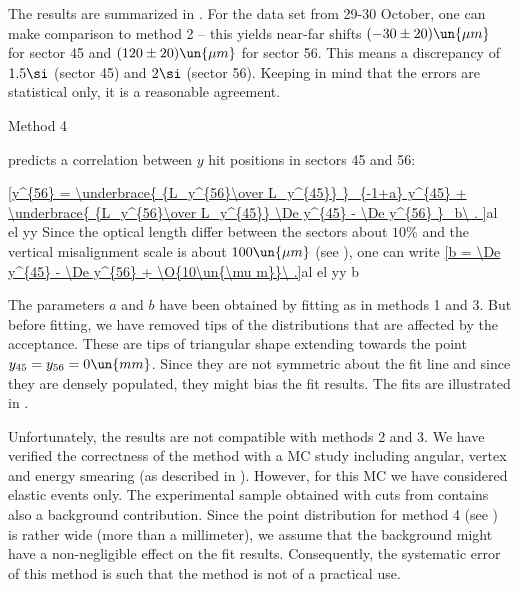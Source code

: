 The results are summarized in . For the data set from 29-30 October, one can make comparison to method 2 -- this yields near-far shifts $(-30\pm 20)\un{\mu m}$ for sector 45 and $(120\pm 20)\un{\mu m}$ for sector 56. This means a discrepancy of $1.5\si$ (sector 45) and $2\si$ (sector 56). Keeping in mind that the errors are statistical only, it is a reasonable agreement.


\caption{Method 4}

 predicts a correlation between $y$ hit positions in sectors 45 and 56:

\eqref{y^{56} =
	\underbrace{ {L_y^{56}\over L_y^{45}} }_{-1+a}  y^{45}
	+ \underbrace{ {L_y^{56}\over L_y^{45}} \De y^{45} - \De y^{56} }_b\ .
}{al el yy}
Since the optical length differ between the sectors about $10\percent$ and the vertical misalignment scale is about $100\un{\mu m}$  (see ), one can write
\eqref{b = \De y^{45} - \De y^{56} + \O{10\un{\mu m}}\ .}{al el yy b}

The parameters $a$ and $b$ have been obtained by fitting as in methods 1 and 3. But before fitting, we have removed tips of the distributions that are affected by the acceptance. These are tips of triangular shape extending towards the point $y_{45} = y_{56} = 0\un{mm}$. Since they are not symmetric about the fit line and since they are densely populated, they might bias the fit results. The fits are illustrated in .


Unfortunately, the results are not compatible with methods 2 and 3. We have verified the correctness of the method with a MC study including angular, vertex and energy smearing (as described in ). However, for this MC we have considered elastic events only. The experimental sample obtained with cuts from  contains also a background contribution. Since the point distribution for method 4 (see ) is rather wide (more than a millimeter), we assume that the background might have a non-negligible effect on the fit results. Consequently, the systematic error of this method is such that the method is not of a practical use.

